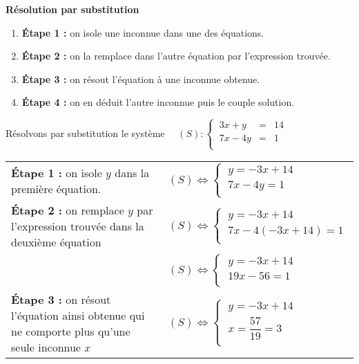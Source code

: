 \documentclass[a4paper,11pt,cours]{nsi}
\begin{document}
\begin{methode}[ ]\textbf{Résolution par substitution}
	\begin{enumerate}[label=\textbullet]
		\item 	\textbf{\'Etape 1 :} on isole une inconnue dans une des équations.
		\item 	\textbf{\'Etape 2 :} on la remplace dans l'autre équation par l'expression trouvée.
		\item	\textbf{\'Etape 3 :} on résout l'équation à une inconnue obtenue.
		\item	\textbf{\'Etape 4 :} on en déduit l'autre inconnue puis le couple solution.	
	\end{enumerate}
	Résolvons par substitution le système $\quad (S):\left\{
	\begin{array}{cll}
		\ 3x+y&=&14 \\
		\ 7x-4y&=&1 \\
	\end{array} \right.$\\
	
	\vspace{0.3cm}
	\begin{tabular}{p{9cm}p{7cm}}
		
		\textbf{\'Etape 1 :} on isole $y$ dans la première équation. & $(S) \Leftrightarrow \left\{
		\begin{array}{l}
			\ y=-3x+14 \\
			\ 7x-4y=1 \\
		\end{array} \right.$\\
		
		\textbf{\'Etape 2 :} on remplace $y$ par l'expression trouvée dans la deuxième équation &  $(S) \Leftrightarrow \left\{
		\begin{array}{l}
			\ y=-3x+14 \\
			\ 7x-4(-3x+14)=1 \\
		\end{array} \right.$\\
		& $(S) \Leftrightarrow \left\{
		\begin{array}{l}
			\ y=-3x+14 \\
			\ 19x-56=1 \\
		\end{array} \right.$\\
		
		\textbf{\'Etape 3 :} on résout l'équation ainsi obtenue qui ne comporte plus qu'une seule inconnue $x$ & $(S) \Leftrightarrow \left\{
		\begin{array}{l}
			\ y=-3x+14 \\
			\ x=\dfrac{57}{19}=3 \\
		\end{array} \right.$\\
		

\end{tabular}
\end{methode}
\end{document}
